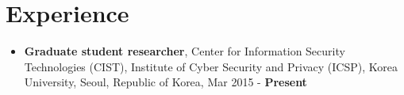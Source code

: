 \documentclass[a4paper,20pt]{article}
\begin{document}
\section{\textbf{Experience}}
\begin{itemize}
    \item {\textbf{Graduate student researcher}, Center for Information Security Technologies (CIST), Institute of Cyber Security and Privacy (ICSP), Korea University, Seoul, Republic of Korea, Mar 2015 - \textbf{Present}}
\end{itemize}
\end{document}
